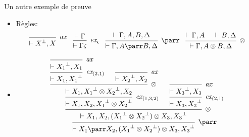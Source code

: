 \documentclass{beamer}
\newcommand*{\orth}{^\perp}
\newcommand*{\tensor}{\otimes}
\newcommand*{\hypv}[1]{\hypo{\vdash #1}}
\newcommand*{\axv}[1]{\infer{0}[\ensuremath{\mathit{ax}}]{\vdash #1}}
\newcommand*{\tensorv}[1]{\infer{2}[\ensuremath{\tensor}]{\vdash #1}}
\newcommand*{\parrv}[1]{\infer{1}[\ensuremath{\parr}]{\vdash #1}}
\newcommand*{\permv}[2]{\infer{1}[\ensuremath{\textit{ex}_{#1}}]{\vdash #2}}
\newcommand*{\permapp}[2]{#2 #1}
\newcommand*{\someperm}{\varsigma}
\newcommand*{\sequent}{\Gamma}
\newcommand*{\sequentbis}{\Delta}
\begin{document}
\begin{frame}{Un autre exemple de preuve}
    \begin{itemize}
        \item Règles: 
            \begin{equation*}
            \begin{prooftree}
              \axv{X\orth, X}
            \end{prooftree}
            \; \; \;
            \begin{prooftree}
              \hypv{\sequent}
              \permv{\someperm}{\permapp{\someperm}{\sequent}}
            \end{prooftree}
            \; \; \;
            \begin{prooftree}
              \hypv{\sequent, A, B, \sequentbis}
              \parrv{\sequent, A \parr B, \sequentbis}
            \end{prooftree}
            \; \; \;
            \begin{prooftree}
              \hypv{\sequent, A}
              \hypv{B, \sequentbis}
              \tensorv{\sequent, A \tensor B, \sequentbis}
            \end{prooftree}
            \end{equation*}
        \item
        \begin{equation*}
        \begin{prooftree}
                 \axv{{X_1}\orth, X_1}
                 \permv{(2, 1)}{X_1, {X_1}\orth}
                 \axv{{X_2}\orth, X_2}
              \tensorv{X_1, {X_1}\orth \tensor {X_2}\orth, X_2}
              \permv{(1, 3, 2)}{X_1, X_2, {X_1}\orth \tensor {X_2}\orth}
              \axv{{X_3}\orth, X_3}
              \permv{(2, 1)}{X_3, {X_3}\orth}
           \tensorv{X_1, X_2, ({X_1}\orth \tensor {X_2}\orth) \tensor X_3, {X_3}\orth}
        \parrv{X_1 \parr X_2, ({X_1}\orth \tensor {X_2}\orth) \tensor X_3, {X_3}\orth}
        \end{prooftree}
        \end{equation*}
    \end{itemize}
\end{frame}
\end{document}
